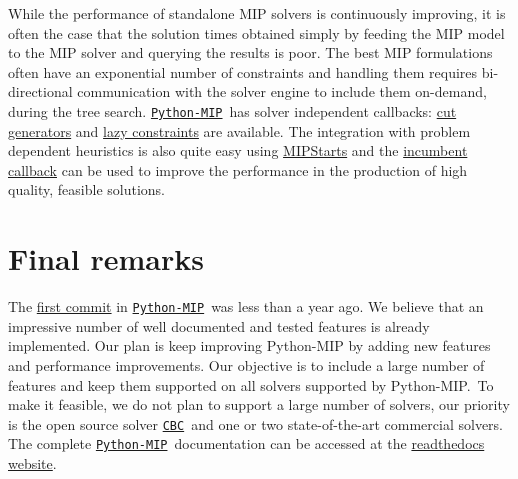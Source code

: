 \documentclass{article}
\def\CBC{\href{https://github.com/coin-or/cbc}{\texttt{CBC}}}
\def\PythonMIP{\href{https://github.com/coin-or/python-mip}{\texttt{Python-MIP}}}
\begin{document}
While the performance of standalone MIP solvers is continuously improving, it is often the case that the solution times obtained simply by feeding the MIP model to the MIP solver and querying the results is poor. The best MIP formulations often have an exponential number of constraints and handling them requires bi-directional communication with the solver engine to include them on-demand, during the tree search. \PythonMIP\ has solver independent callbacks: \href{https://python-mip.readthedocs.io/en/latest/custom.html#cut-callback}{cut generators} and \href{https://python-mip.readthedocs.io/en/latest/custom.html#lazy-constraints}{lazy constraints} are available. The integration with problem dependent heuristics is also quite easy using \href{https://python-mip.readthedocs.io/en/latest/custom.html#providing-initial-feasible-solutions}{MIPStarts} and the \href{https://python-mip.readthedocs.io/en/latest/classes.html#incumbentupdater}{incumbent callback} can be used to improve the performance in the production of high quality, feasible solutions.

\section{Final remarks}

The \href{https://github.com/coin-or/python-mip/commit/ba1719db4bf033dd661844bc797779a98a884d81}{first commit} in \PythonMIP\ was less than a year ago. We believe that an impressive number of well documented and tested features is already implemented. Our plan is keep improving Python-MIP by adding new features and performance improvements. Our objective is to include a large number of features and keep them supported on all solvers supported by Python-MIP.\ To make it feasible, we do not plan to support a large number of solvers, our priority is the open source solver \CBC\ and one or two state-of-the-art commercial solvers. The complete \PythonMIP\ documentation can be accessed at the \href{https://python-mip.readthedocs.io}{readthedocs website}.



\end{document}
